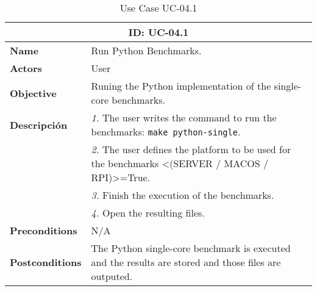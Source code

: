 \begin{table}[H]
    \centering
    \begin{tabular}{l p{10cm}}
        \toprule
        \multicolumn{2}{c}{\textbf{ID: UC-04.1}} \\
        \toprule
        \textbf{Name}                         &  Run Python Benchmarks. \\
        \textbf{Actors}                       &  User \\
        \textbf{Objective}                    &  Runing the Python implementation of the single-core benchmarks. \\
        \multirow{1}{*}{\textbf{Descripción}} & \textsl{1.} The user writes the command to run the benchmarks: \texttt{make python-single}.\\
                                              & \textsl{2.} The user defines the platform to be used for the benchmarks <(SERVER / MACOS / RPI)>=True.\\
                                              & \textsl{3.} Finish the execution of the benchmarks.\\
                                              & \textsl{4.} Open the resulting files.\\ 
        \textbf{Preconditions}                &  N/A \\
        \textbf{Postconditions}               &  The Python single-core benchmark is executed and the results are stored and those files are outputed. \\
    \end{tabular}
    \caption{Use Case UC-04.1}
    \label{tab:uc-04.1}
\end{table}

